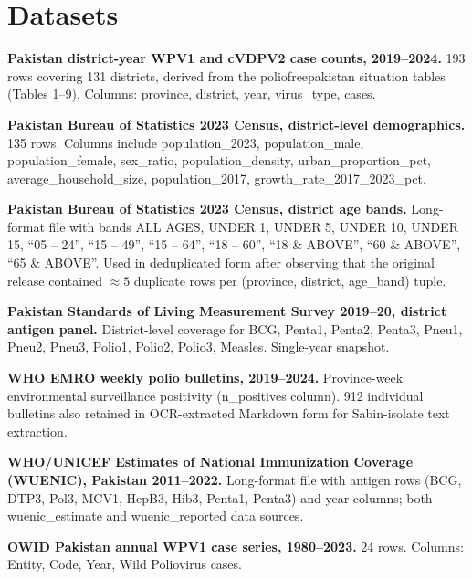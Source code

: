 \documentclass[11pt]{article}
\begin{document}
\section{Datasets}
\label{app:datasets}

\begin{description}[itemsep=0.3em, leftmargin=2em, labelindent=0em]
\item[D1.] \textbf{Pakistan district-year WPV1 and cVDPV2 case counts, 2019--2024.} 193 rows covering 131 districts, derived from the poliofreepakistan situation tables (Tables 1--9). Columns: province, district, year, virus\_type, cases.

\item[D2.] \textbf{Pakistan Bureau of Statistics 2023 Census, district-level demographics.} 135 rows. Columns include population\_2023, population\_male, population\_female, sex\_ratio, population\_density, urban\_proportion\_pct, average\_household\_size, population\_2017, growth\_rate\_2017\_2023\_pct.

\item[D3.] \textbf{Pakistan Bureau of Statistics 2023 Census, district age bands.} Long-format file with bands ALL AGES, UNDER 1, UNDER 5, UNDER 10, UNDER 15, ``05 -- 24'', ``15 -- 49'', ``15 -- 64'', ``18 -- 60'', ``18 \& ABOVE'', ``60 \& ABOVE'', ``65 \& ABOVE''. Used in deduplicated form after observing that the original release contained $\approx 5$ duplicate rows per (province, district, age\_band) tuple.

\item[D4.] \textbf{Pakistan Standards of Living Measurement Survey 2019--20, district antigen panel.} District-level coverage for BCG, Penta1, Penta2, Penta3, Pneu1, Pneu2, Pneu3, Polio1, Polio2, Polio3, Measles. Single-year snapshot.

\item[D5.] \textbf{WHO EMRO weekly polio bulletins, 2019--2024.} Province-week environmental surveillance positivity (n\_positives column). 912 individual bulletins also retained in OCR-extracted Markdown form for Sabin-isolate text extraction.

\item[D6.] \textbf{WHO/UNICEF Estimates of National Immunization Coverage (WUENIC), Pakistan 2011--2022.} Long-format file with antigen rows (BCG, DTP3, Pol3, MCV1, HepB3, Hib3, Penta1, Penta3) and year columns; both wuenic\_estimate and wuenic\_reported data sources.

\item[D7.] \textbf{OWID Pakistan annual WPV1 case series, 1980--2023.} 24 rows. Columns: Entity, Code, Year, Wild Poliovirus cases.


\end{description}
\end{document}
